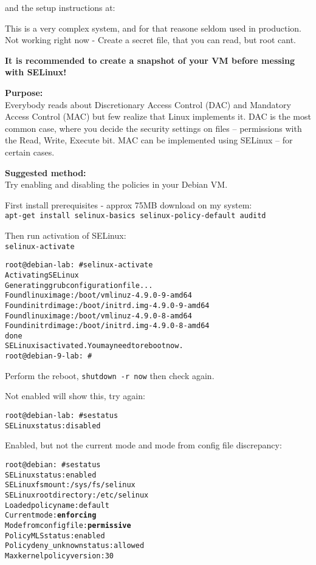\documentclass[a4paper,11pt,notitlepage]{report}
\begin{document}
and the setup instructions at:\\

This is a very complex system, and for that reasone seldom used in production. Not working right now - Create a secret file, that you can read, but root cant.

{\bf It is recommended to create a snapshot of your VM before messing with SELinux!}

{\bf Purpose:}\\
Everybody reads about Discretionary Access Control (DAC) and Mandatory Access Control (MAC) but few realize that Linux implements it. DAC is the most common case, where you decide the security settings on files -- permissions with the Read, Write, Execute bit. MAC can be implemented using SELinux -- for certain cases.


{\bf Suggested method:}\\
Try enabling and disabling the policies in your Debian VM.

First install prerequisites - approx 75MB download on my system:\\
\verb+apt-get install selinux-basics selinux-policy-default auditd+

Then run activation of SELinux:\\
\verb+selinux-activate+

\begin{alltt}
  root@debian-lab:~# selinux-activate
  Activating SE Linux
  Generating grub configuration file ...
  Found linux image: /boot/vmlinuz-4.9.0-9-amd64
  Found initrd image: /boot/initrd.img-4.9.0-9-amd64
  Found linux image: /boot/vmlinuz-4.9.0-8-amd64
  Found initrd image: /boot/initrd.img-4.9.0-8-amd64
  done
  SE Linux is activated.  You may need to reboot now.
  root@debian-9-lab:~#
\end{alltt}

Perform the reboot, \verb+shutdown -r now+ then check again.

Not enabled will show this, try again:
\begin{alltt}
root@debian-lab:~# sestatus
SELinux status:                 disabled
\end{alltt}

Enabled, but not the current mode and mode from config file discrepancy:
\begin{alltt}
root@debian:~# sestatus
SELinux status:                 enabled
SELinuxfs mount:                /sys/fs/selinux
SELinux root directory:         /etc/selinux
Loaded policy name:             default
Current mode:                   {\bf enforcing}
Mode from config file:          {\bf permissive}
Policy MLS status:              enabled
Policy deny_unknown status:     allowed
Max kernel policy version:      30
\end{alltt}
\end{document}
